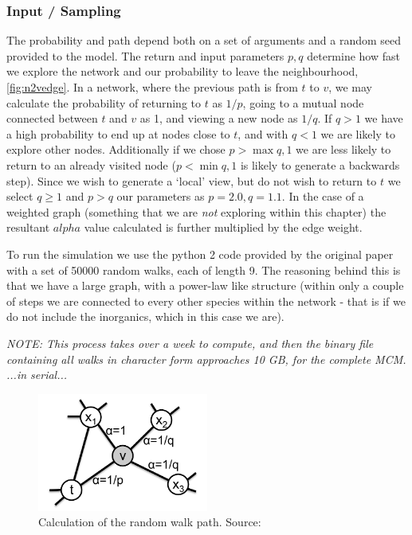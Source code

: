 \subsubsection{Input / Sampling}
The probability and path depend both on a set of arguments and a random seed provided to the model. The return and input parameters $p,q$ determine how fast we explore the network and our probability to leave the neighbourhood, \autoref{fig:n2vedge}. In a network, where the previous path is from $t$ to $v$, we may calculate the probability of returning to $t$ as $1/p$, going to a mutual node connected between $t$ and $v$ as 1, and viewing a new node as $1/q$.
If $q>1$ we have a high probability to end up at nodes close to $t$, and with $q<1$ we are likely to explore other nodes. Additionally if we chose $p> \max{q,1}$ we are less likely to return to an already visited node ($p < \min{q,1}$ is likely to generate a backwards step). Since we wish to generate a `local' view, but do not wish to return to $t$ we select  $q \ge 1$ and $p > q$ our parameters as  $p = 2.0,q=1.1$.  In the case of a weighted graph (something that we are \textit{not} exploring within this chapter) the resultant $alpha$ value calculated is further multiplied by the edge weight.

To run the simulation we use the python 2 code provided by the original paper \cite{node2vec} with a set of 50000 random walks, each of length 9. The reasoning behind this is that we have a large graph, with a power-law like structure (within only a couple of steps we are connected to every other species within the network - that is if we do not include the inorganics, which in this case we are).

\textit{NOTE: This process takes over a week to compute, and then the binary file containing all walks in character form approaches 10 GB, for the complete MCM. ...in serial... }

\begin{figure}[H]
  \centering
\includegraphics[width=0.5\textwidth]{4fig/n2vedge.png}
\caption{Calculation of the random walk path. Source:\cite{node2vec}}\label{fig:n2vedge}
\end{figure}

